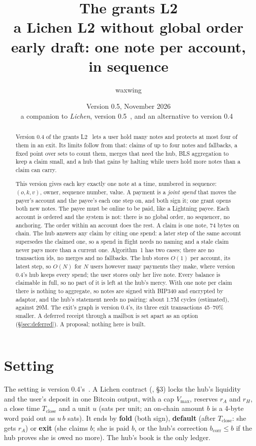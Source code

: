 \documentclass[11pt]{article}
\title{\textbf{The grants L2}\\a Lichen L2 without global order\\[2pt]\large early draft: one note per account, in sequence}
\author{waxwing}
\date{Version 0.5, November 2026\\[2pt]\small a companion to \emph{Lichen}, version 0.5~\cite{lichen}, and an alternative to version 0.4~\cite{grants04}}
\theoremstyle{plain}
\theoremstyle{definition}
\newcommand{\vmax}{V_{\max}}
\newcommand{\Tc}{T_{\mathrm{close}}}
\newcommand{\bcorr}{b_{\mathrm{corr}}}
\begin{document}
\maketitle

\begin{abstract}
Version 0.4 of the grants L2~\cite{grants04} lets a user hold many notes
and protects at most four of them in an exit. Its limits follow from
that: claims of up to four notes and fallbacks, a fixed point over sets
to count them, merges that need the hub, BLS aggregation to keep a claim
small, and a hub that gains by halting while users hold more notes than
a claim can carry.

This version gives each key exactly one note at a time, numbered in
sequence: $(o, k, v)$, owner, sequence number, value. A payment is a
\emph{joint spend} that moves the payer's account and the payee's each
one step on, and both sign it; one grant opens both new notes. The payee
must be online to be paid, like a Lightning payee. Each account is
ordered and the system is not: there is no global order, no sequencer,
no anchoring. The order within an account does the rest. A claim is one
note, 74 bytes on chain. The hub answers any claim by citing one spend:
a later step of the same account supersedes the claimed one, so a
spend in flight needs no naming and a stale claim never pays more than
a current one. Algorithm~1 has two cases; there are no transaction ids,
no merges and no fallbacks. The hub stores $O(1)$ per account, its
latest step, so $O(N)$ for $N$ users however many payments they make,
where version 0.4's hub keeps every spend; the user stores only her
live note. Every balance is claimable in full, so no part of it is left
at the hub's mercy. With one note per
claim there is nothing to aggregate, so notes are signed with BIP340 and
encrypted by adaptor, and the hub's statement needs no pairing: about
1.7M cycles (estimated), against 29M. The exit's graph is version
0.4's, its three exit transactions 45--70\% smaller. A deferred receipt
through a mailbox is set apart as an option (\S\ref{sec:deferred}). A
proposal; nothing here is built.
\end{abstract}

\tableofcontents

\section{Setting}

The setting is version 0.4's~\cite{grants04}. A Lichen contract
(\cite{lichen}, \S3) locks the hub's liquidity and the user's deposit in
one Bitcoin output, with a cap $\vmax$, reserves $r_A$ and $r_H$, a
close time $\Tc$ and a unit $u$ (sats per unit; an on-chain amount $b$
is a 4-byte word paid out as $u\,b$ sats). It ends by \textbf{fold}
(both sign), \textbf{default} (after $\Tc$: she gets $r_A$) or
\textbf{exit} (she claims $b$; she is paid $b$, or the hub's correction
$\bcorr \le b$ if the hub proves she is owed no more). The hub's book is the
only ledger.
\end{document}
